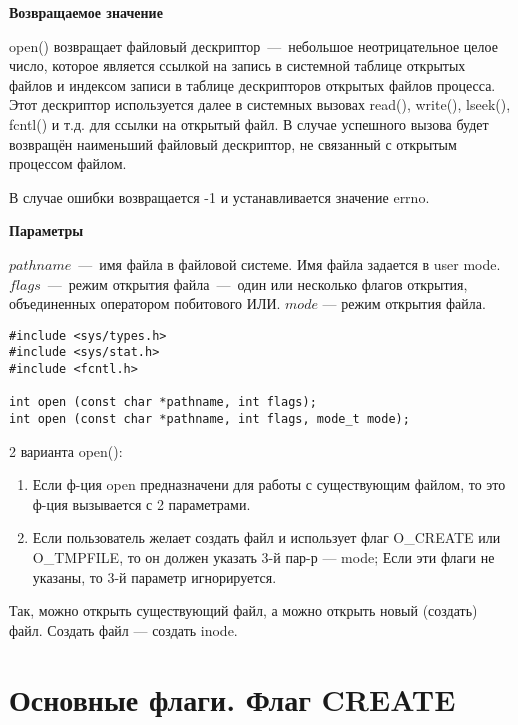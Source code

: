 \textbf{Возвращаемое значение}

open() возвращает файловый дескриптор~---~небольшое неотрицательное целое число, которое является ссылкой на запись в системной таблице открытых файлов и индексом записи в таблице дескрипторов открытых файлов процесса. Этот дескриптор используется далее в системных вызовах read(), write(), lseek(), fcntl() и т.д. для ссылки на открытый файл. В случае успешного вызова будет возвращён наименьший файловый дескриптор, не связанный с открытым процессом файлом.

В случае ошибки возвращается -1 и устанавливается значение errno.

\textbf{Параметры}

$pathname$~---~имя файла в файловой системе. Имя файла задается в user mode. $flags$~---~режим открытия файла~---~один или несколько флагов открытия, объединенных оператором побитового ИЛИ. $mode$ --- режим открытия файла.

\begin{lstlisting}
#include <sys/types.h>
#include <sys/stat.h>
#include <fcntl.h>

int open (const char *pathname, int flags);
int open (const char *pathname, int flags, mode_t mode);
\end{lstlisting}

2 варианта open():
\begin{enumerate}
    \item Если ф-ция open предназначени для работы с существующим файлом, то это ф-ция вызывается с 2 параметрами.
    \item Если пользователь желает создать файл и использует флаг O\_CREATE или O\_TMPFILE, то он должен указать 3-й пар-р --- mode; Если эти флаги не указаны, то 3-й параметр игнорируется.
\end{enumerate}

Так, можно открыть существующий файл, а можно открыть новый (создать) файл. Создать файл --- создать inode.


\section{Основные флаги. Флаг CREATE}

